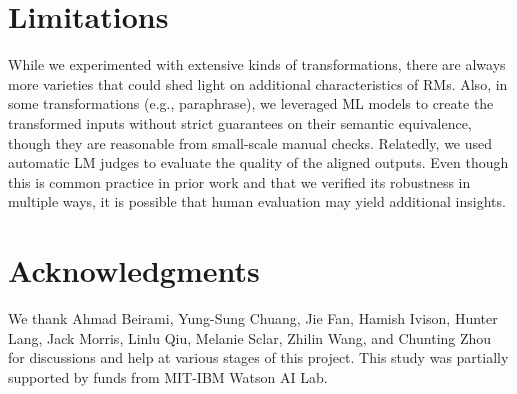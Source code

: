 \section*{Limitations}

While we experimented with extensive kinds of transformations, there are always more varieties that could shed light on additional characteristics of RMs.
Also, in some transformations (e.g., paraphrase), we leveraged ML models to create the transformed inputs without strict guarantees on their semantic equivalence, though they are reasonable from small-scale manual checks.
Relatedly, we used automatic LM judges to evaluate the quality of the aligned outputs.
Even though this is common practice in prior work and that we verified its robustness in multiple ways, it is possible that human evaluation may yield additional insights.

\iflongversion
\section*{Acknowledgments}

We thank
Ahmad Beirami,
Yung-Sung Chuang,
Jie Fan,
Hamish Ivison,
Hunter Lang,
Jack Morris,
Linlu Qiu,
Melanie Sclar,
Zhilin Wang,
and
Chunting Zhou
for discussions and help at various stages of this project. This study was partially supported by funds from MIT-IBM Watson AI Lab.
\fi
